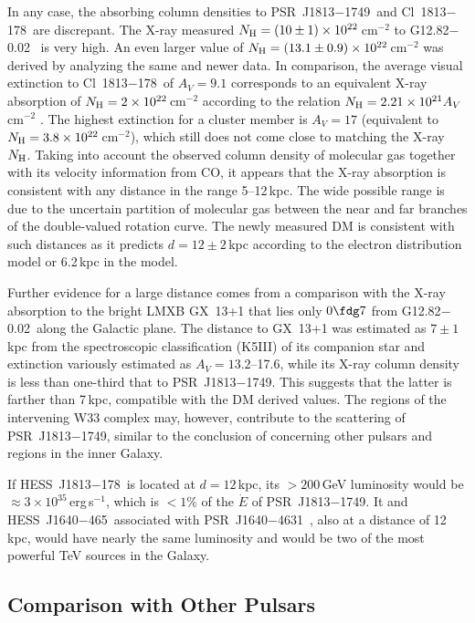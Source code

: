 \documentclass[twocolumn]{aastex62}
\newcommand\snr{G12.82$-$0.02}
\newcommand\tev{HESS~J1813$-$178}
\newcommand\tevb{HESS~J1640$-$465}
\newcommand\psr{PSR~J1813$-$1749}
\newcommand\psrb{PSR~J1640$-$4631}
\newcommand\cl{Cl~1813$-$178}
\begin{document}
In any case, the absorbing column densities to \psr\ and \cl\ are
discrepant. The X-ray measured $N_{\rm H} = (10\pm1) \times
10^{22}$\,cm$^{-2}$ to \snr\ \citep{hel07} is very high.  An even
larger value of $N_{\rm H} = (13.1\pm 0.9) \times 10^{22}$\,cm$^{-2}$
was derived by \citet{ho20} analyzing the same and newer data.  In
comparison, the average visual extinction to \cl\ of $A_V = 9.1$
\citep{mes11} corresponds to an equivalent X-ray absorption of
$N_{\rm H} = 2 \times 10^{22}$\,cm$^{-2}$ according to the relation
$N_{\rm H} = 2.21 \times 10^{21}A_V$\,cm$^{-2}$ \citep{guv09}.  The
highest extinction for a cluster member is $A_V = 17$ (equivalent
to $N_{\rm H} = 3.8\times 10^{22}$\,cm$^{-2}$), which still does
not come close to matching the X-ray $N_{\rm H}$.  Taking into
account the observed column density of molecular gas together with
its velocity information from CO, it appears that the X-ray absorption
is consistent with any distance in the range 5--12\,kpc.  The wide
possible range is due to the uncertain partition of molecular gas
between the near and far branches of the double-valued rotation
curve.   The newly measured DM is consistent with such distances
as it predicts $d=12\pm2$\,kpc according to the \citet{cor02}
electron distribution model or 6.2\,kpc in the \citet{yao17} model.

Further evidence for a large distance comes from a comparison with
the X-ray absorption to the bright LMXB GX~13+1 that lies only
$0\fdg7$  from \snr\ along the Galactic plane.  The distance to
GX~13+1 was estimated as $7\pm1$\,kpc \citep{ban99} from the
spectroscopic classification (K5III) of its companion star and
extinction variously estimated as $A_V=13.2$--17.6, while its X-ray
column density is less than one-third that to \psr.  This suggests
that the latter is farther than 7\,kpc, compatible with the DM
derived values.  The  regions of the intervening W33
complex may, however, contribute to the scattering of \psr, similar
to the conclusion of \citet{dex17} concerning other pulsars and
 regions in the inner Galaxy.

If \tev\ is located at $d=12$\,kpc, its $>200$\,GeV luminosity would
be $\approx3\times 10^{35}$\,erg\,s$^{-1}$, which is $<1\%$ of the
$\dot E$ of \psr.  It and \tevb\ associated with \psrb\ \citep{got14},
also at a distance of 12\,kpc, would have nearly the same luminosity
and would be two of the most powerful TeV sources in the Galaxy.

\subsection{Comparison with Other Pulsars\label{sec:comparison}}
\end{document}
